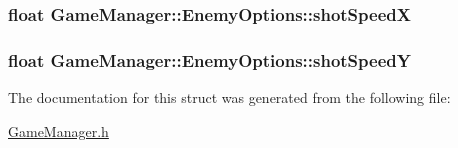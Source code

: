 \label{d9/dd3/struct_game_manager_1_1_enemy_options_a751ac940c54fb14b33d75015cb5e7239}
\hypertarget{struct_game_manager_1_1_enemy_options_a4ec75396623519e2a475cc4d0233af56}{
\subsubsection[{shotSpeedX}]{\setlength{\rightskip}{0pt plus 5cm}float {\bf GameManager::EnemyOptions::shotSpeedX}}}
\label{d9/dd3/struct_game_manager_1_1_enemy_options_a4ec75396623519e2a475cc4d0233af56}
\hypertarget{struct_game_manager_1_1_enemy_options_a106474977775d14f825ef21a90e77094}{
\subsubsection[{shotSpeedY}]{\setlength{\rightskip}{0pt plus 5cm}float {\bf GameManager::EnemyOptions::shotSpeedY}}}
\label{d9/dd3/struct_game_manager_1_1_enemy_options_a106474977775d14f825ef21a90e77094}


The documentation for this struct was generated from the following file:\begin{DoxyCompactItemize}
\item 
\hyperlink{_game_manager_8h}{GameManager.h}\end{DoxyCompactItemize}
